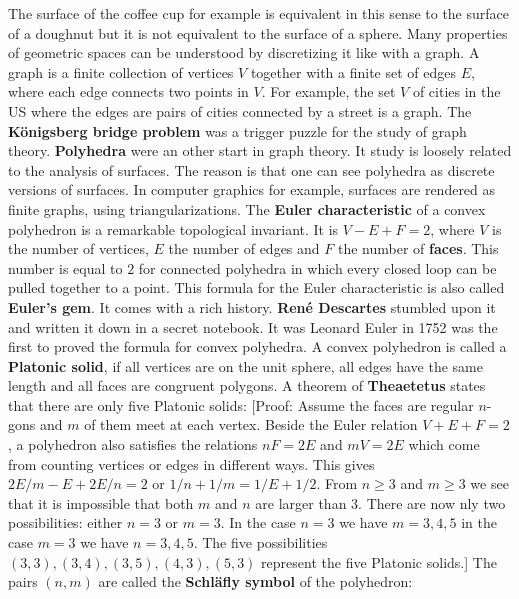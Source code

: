\documentclass[12pt]{amsart}
\newcounter{example}    \def\example#1{ \item \fontsize{12}{15} \selectfont #1 \fontsize{12}{15} \selectfont }
\begin{document}
The surface of the coffee cup for example is equivalent in this sense to the 
surface of a doughnut but it is not equivalent to the surface of a sphere. 
Many properties of geometric spaces can be understood by discretizing
it like with a graph. A graph is a finite collection of 
vertices $V$ together with a finite set of edges $E$, where each edge
connects two points in $V$. For example, the set $V$ of cities in the US where the edges 
are pairs of cities connected by a street is a graph. 
The {\bf K\"onigsberg bridge problem} was a trigger puzzle 
for the study of graph theory. {\bf Polyhedra} were an other start in graph theory.
It study is loosely related to the analysis of surfaces.
The reason is that one can see polyhedra as discrete versions of surfaces. 
In computer graphics for example, surfaces are rendered as finite graphs, 
using triangularizations. 
The {\bf Euler characteristic} of a convex polyhedron is a remarkable topological 
invariant. It is $V-E+F   = 2$, 
where $V$ is the number of vertices, $E$ the number of edges and $F$ the number of
{\bf faces}. This number is equal to $2$ for connected polyhedra in which every 
closed loop can be pulled together to a point. This formula for the Euler 
characteristic is also called {\bf Euler's gem}. It comes with a rich history. 
{\bf Ren\'e Descartes} stumbled upon it and written it down in a 
secret notebook. It was Leonard Euler in 1752 was the first to proved the
formula for convex polyhedra.
A convex polyhedron is called a {\bf Platonic solid}, if all vertices are 
on the unit sphere, all edges have the same length and all faces are 
congruent polygons. A theorem of {\bf Theaetetus} states that there are only 
five Platonic solids: %
[Proof: Assume the faces are regular $n$-gons and $m$ of them meet at each vertex.
Beside the Euler relation $V+E+F=2$, a polyhedron also satisfies the relations 
$n F=2 E$ and $m V = 2 E$ which come from counting vertices
or edges in different ways. This gives $2E/m - E + 2E/n=2$ or $1/n + 1/m = 1/E + 1/2$.
From $n \geq 3$ and $m \geq 3$ we see that it is impossible that both $m$ and $n$ are larger than $3$.
There are now nly two possibilities: either $n=3$ or $m=3$. In the case $n=3$ we have $m=3,4,5$
in the case $m=3$ we have $n=3,4,5$. The five possibilities
$(3,3),(3,4),(3,5),(4,3),(5,3)$ represent the five Platonic solids.]
The pairs $(n,m)$ are called the {\bf Schl\"afly symbol} of the polyhedron:
\end{document}
